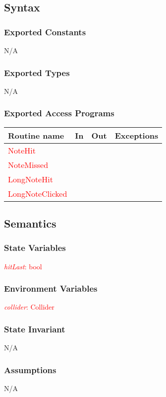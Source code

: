 \documentclass[12pt]{article}
\begin{document}
\subsection {Syntax}

\subsubsection {Exported Constants}
N/A
\subsubsection {Exported Types}
N/A

\subsubsection {Exported Access Programs}

\begin{tabular}{| l | l | l | l |}
\hline
\textbf{Routine name} & \textbf{In} & \textbf{Out} & \textbf{Exceptions}\\
\hline
\textcolor{red}{NoteHit} & & &\\
\hline
\textcolor{red}{NoteMissed} & & &\\
\hline
\textcolor{red}{LongNoteHit} & & &\\
\hline
\textcolor{red}{LongNoteClicked} & & &\\
\hline
\end{tabular}

\subsection {Semantics}

\subsubsection {State Variables}
\textcolor{red}{\textit{hitLast}: bool} 

\subsubsection {Environment Variables}
\textcolor{red}{\textit{collider}: Collider} 

\subsubsection {State Invariant}
N/A

\subsubsection {Assumptions}
N/A
\end{document}
